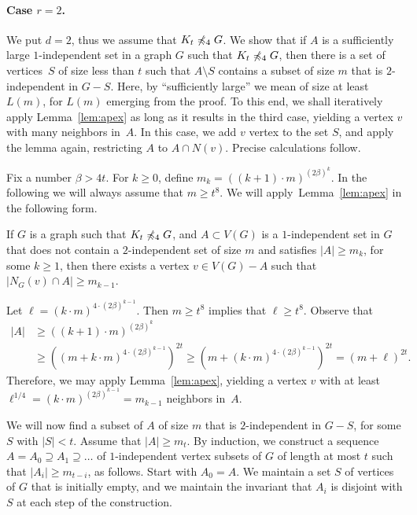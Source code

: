 \paragraph{Case $r=2$.}
We put $d=2$, thus we assume that $K_t\not\preccurlyeq_4 G$.  We show that
if $A$ is a sufficiently large $1$-independent set in a graph $G$ such
that $K_t\not\preccurlyeq_4 G$, then there is a set of vertices~$S$ of size
less than $t$ such that $A\setminus S$ contains a subset of size $m$
that is $2$-independent in $G-S$.  Here, by ``sufficiently large'' we
mean of size at least $L(m)$, for $L(m)$ emerging from the proof.  To
this end, we shall iteratively apply Lemma~\ref{lem:apex} as long as
it results in the third case, yielding a vertex $v$ with many
neighbors in~$A$. In this case, we add $v$ vertex to the set $S$, and
apply the lemma again, restricting $A$ to $A\cap N(v)$.  Precise
calculations follow.

\newcommand{\mbull}{\widehat{m}}

Fix a number $\beta>4t$. For $k\ge 0$, define
$m_k=((k+1)\cdot m)^{(2\beta)^k}$.  In the following we will always
assume that $m\geq t^8$.  We will apply~Lemma~\ref{lem:apex} in the
following form.
\begin{claim}\label{cor:apex}
  If $G$ is a graph such that $K_t\not\preccurlyeq_4 G$, and $A\subset V(G)$
  is a $1$-independent set in $G$ that does not contain a
  $2$-independent set of size $m$ and satisfies $|A|\ge m_k$, for some
  $k\geq 1$, then there exists a vertex $v\in V(G)-A$ such that
  $|N_G(v)\cap A| \ge m_{k-1}$.
\end{claim}
\begin{clproof}
  Let $\ell=(k\cdot m)^{4\cdot(2\beta)^{k-1}}$.  Then $m\ge t^8$
  implies that $\ell\ge t^8$.  Observe that
\begin{align*}
  |A| & \ge \left((k+1)\cdot m\right)^{(2\beta)^k} \\
      & \ge \left ((m+ k\cdot m)^{4\cdot(2\beta)^{k-1}} \right)^{2t}
        \ge \left(m+(k\cdot m)^{4\cdot (2\beta)^{k-1}}\right)^{2t}=(m+\ell)^{2t}.
\end{align*}
Therefore, we may apply Lemma~\ref{lem:apex}, yielding a vertex $v$
with at least $\ell^{1/4}=(k\cdot m)^{(2\beta)^{k-1}}=m_{k-1}$
neighbors in~$A$.
\end{clproof}

We will now find a subset of $A$ of size $m$ that is $2$-independent
in $G-S$, for some $S$ with $|S|<t$.  Assume that $|A|\ge m_t$. By
induction, we construct a sequence $A=A_0\supseteq A_1\supseteq\ldots$
of \mbox{$1$-independent} vertex subsets of $G$ of length at most $t$
such that $|A_i|\ge m_{t-i}$, as follows. Start with $A_0=A$. We
maintain a set $S$ of vertices of $G$ that is initially empty, and we
maintain the invariant that $A_i$ is disjoint with $S$ at each step of
the construction.

